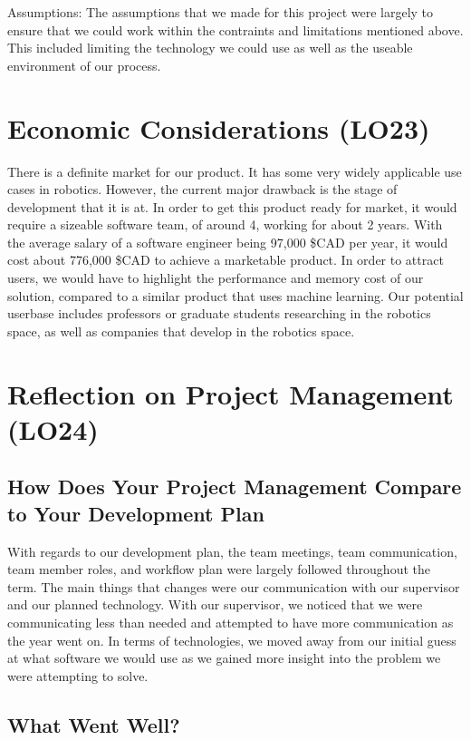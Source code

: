 \documentclass{article}
\begin{document}
Assumptions: The assumptions that we made for this project were largely to ensure that we could work within the contraints and limitations mentioned above. 
This included limiting the technology we could use as well as the useable environment of our process.



\section{Economic Considerations (LO23)}

There is a definite market for our product. It has some very widely applicable use cases in robotics. However, the current major drawback is the 
stage of development that it is at. In order to get this product ready for market, it would require a sizeable software team, of around 4, working for 
about 2 years. With the average salary of a software engineer being 97,000 \$CAD per year, it would cost about 776,000 \$CAD to achieve a marketable product.
In order to attract users, we would have to highlight the performance and memory cost of our solution, compared to a similar product that uses machine learning. 
Our potential userbase includes professors or graduate students researching in the robotics space, as well as companies that develop in the robotics space.

\section{Reflection on Project Management (LO24)}

\subsection{How Does Your Project Management Compare to Your Development Plan}

With regards to our development plan, the team meetings, team communication, team member roles, and workflow plan
were largely followed throughout the term. The main things that changes were our communication with our supervisor and our
planned technology. With our supervisor, we noticed that we were communicating less than needed and attempted to have more communication as the year went on. 
In terms of technologies, we moved away from our initial guess at what software we would use as we gained more insight into the problem we were attempting to solve.

\subsection{What Went Well?}
\end{document}
